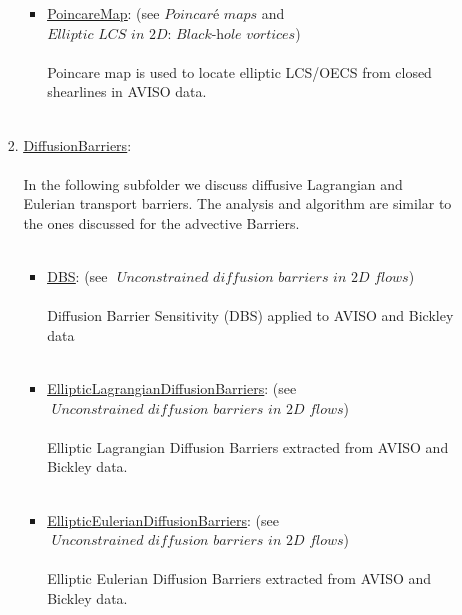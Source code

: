 \documentclass{article}
\begin{document}
\begin{enumerate}
\begin{enumerate}
\begin{enumerate}
\begin{itemize}
\item \href{https://github.com/EncinasBartos/TBarrier/tree/main/TBarrier/2D/demos/AdvectiveBarriers/PoincareMap}{\underline{PoincareMap}}: (see $ \textit{Poincaré maps} $ and $ \textit{Elliptic LCS in 2D: Black-hole vortices} $)\\ \\
Poincare map is used to locate elliptic LCS/OECS from closed shearlines in AVISO data. \\ \\
\end{itemize}
\item \href{https://github.com/EncinasBartos/TBarrier/tree/main/TBarrier/2D/demos/DiffusionBarriers}{\underline{DiffusionBarriers}}: \\ \\
In the following subfolder we discuss diffusive Lagrangian and Eulerian transport barriers. The analysis and algorithm are similar to the ones discussed for the advective Barriers. \\ \\
\begin{itemize}
\item \href{https://github.com/EncinasBartos/TBarrier/tree/main/TBarrier/2D/demos/DiffusionBarriers/DBS}{\underline{DBS}}: (see $ \textit{ Unconstrained diffusion barriers in 2D flows} $) \\ \\
Diffusion Barrier Sensitivity (DBS) applied to AVISO and Bickley data \\ \\
\item \href{https://github.com/EncinasBartos/TBarrier/tree/main/TBarrier/2D/demos/DiffusionBarriers/EllipticLagrangianDiffusionBarriers}{\underline{EllipticLagrangianDiffusionBarriers}}: (see $ \textit{ Unconstrained diffusion barriers in 2D flows} $) \\ \\
Elliptic Lagrangian Diffusion Barriers extracted from AVISO and Bickley data. \\ \\
\item \href{https://github.com/EncinasBartos/TBarrier/tree/main/TBarrier/2D/demos/DiffusionBarriers/EllipticEulerianDiffusionBarriers}{\underline{EllipticEulerianDiffusionBarriers}}: (see $ \textit{ Unconstrained diffusion barriers in 2D flows} $) \\ \\
Elliptic Eulerian Diffusion Barriers extracted from AVISO and Bickley data. \\ \\

\end{itemize}
\end{enumerate}
\end{enumerate}
\end{enumerate}
\end{document}
